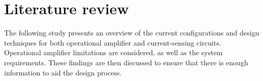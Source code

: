 \chapter{Literature review}\label{chap:Lit}

The following study presents an overview of the current configurations and design techniques for both operational amplifier and current-sensing circuits.
Operational amplifier limitations are considered, as well as the system requirements. These findings are then discussed to ensure that there is
enough information to aid the design process.


